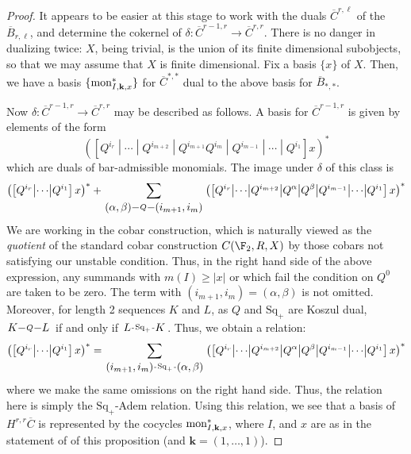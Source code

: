 \documentclass[11pt]{article}
\makeatletter
\newcommand{\produces}[3]{{#1}{#3}{#2}}
\renewcommand{\Q}{Q}
\newcommand{\SqShift}{\Sq_{+}}
\newcommand{\Sq}{\mathrm{Sq}}
\newcommand{\DyerLashov}{R}
\newcommand{\minDim}{m}
\newcommand{\BarMonomial}[3]{\textup{mon}_{#1,#2,#3}}
\renewcommand{\produces}[3]{
{
\def\labelstyle{\scriptstyle}
\xymatrix@C=2em@1{
{#1}
\ar@{-}[r]|-{{\,#3\,}}
&%
{#2}%
}}}
\makeatother
\begin{document}
\begin{KoszulComplexes2plus}
\begin{proof}
It appears to be easier at this stage to work with the duals $\overline{C}^{r,\ell}$ of the $\overline{B}_{r,\ell}$, and determine the cokernel of $\delta:\overline{C}^{r-1,r}\to\overline{C}^{r,r}$. There is no danger in dualizing twice: $X$, being trivial, is the union of its finite dimensional subobjects, so that we may assume that $X$ is finite dimensional. Fix a basis $\{x\}$ of $X$. %
Then, we have a basis $\{\BarMonomial{I}{\textbf{k}}{x}^*\}$ for $\overline{C}^{*,*}$ dual to the above basis for $\overline{B}_{*,*}$.

Now $\delta:\overline{C}^{r-1,r}\to\overline{C}^{r,r}$ may be described as follows. A basis for $\overline{C}^{r-1,r}$ is given by elements of the form
\[\left(\left[\Q^{i_r}\middle|\cdots\middle|\Q^{i_{m+2}}  \middle|\Q^{i_{m+1}}\Q^{i_m}\middle|\Q^{i_{m-1}}\middle|\cdots \middle|\Q^{i_1} \right]x\right)^*\]
which are duals of bar-admissible monomials. The image under $\delta$ of this class is
\[
\left(\left[\Q^{i_r}\middle|\cdots \middle|\Q^{i_1} \right]x\right)^*
+
\sum_{\produces{(\alpha,\beta)}{(i_{m+1},i_m)}{\Q}}\left(\left[\Q^{i_r}\middle|\cdots\middle|\Q^{i_{m+2}}  \middle|\Q^{\alpha}\middle|\Q^{\beta}\middle|\Q^{i_{m-1}}\middle|\cdots \middle|\Q^{i_1} \right]x\right)^*\]
We are working in the cobar construction, which is naturally viewed as the \emph{quotient} of the standard cobar construction $C(\F_2,\DyerLashov,X)$ by those cobars not satisfying our unstable condition. Thus, in the right hand side of the above expression, any summands with $\minDim(I)\geq|x|$ or which fail the condition on $\Q^0$ are taken to be zero.
%
The term with $(i_{m+1},i_m)=(\alpha,\beta)$ is not omitted. Moreover, for length 2 sequences $K$ and $L$, as $\Q$ and $\SqShift$ are Koszul dual, $\produces{K}{L}{\Q}$ if and only if $\produces{L}{K}{\SqShift}$. Thus, we obtain a relation:
\[\left(\left[\Q^{i_r}\middle|\cdots \middle|\Q^{i_1} \right]x\right)^*
=
\sum_{\produces{(i_{m+1},i_m)}{(\alpha,\beta)}{\SqShift}}\left(\left[\Q^{i_r}\middle|\cdots\middle|\Q^{i_{m+2}}  \middle|\Q^{\alpha}\middle|\Q^{\beta}\middle|\Q^{i_{m-1}}\middle|\cdots \middle|\Q^{i_1} \right]x\right)^*\]
where we make the same omissions on the right hand side. Thus, the relation here is simply the $\SqShift$-Adem relation.
Using this relation, we see that a basis of $H^{r,r}\overline{C}$ is represented by the cocycles $\BarMonomial{I}{\textbf{k}}{x}^*$, where $I$, and $x$ are as in the statement of of this proposition (and $\textbf{k}=(1,\ldots,1)$).


\end{proof}
\end{KoszulComplexes2plus}
\end{document}
